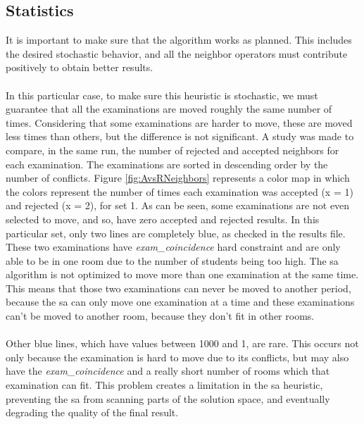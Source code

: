 \subsection{Statistics}
\label{sub:SAStatistics}
It is important to make sure that the algorithm works as planned. This includes the desired stochastic behavior, and all the neighbor operators must contribute positively to obtain better results.\\
\\
In this particular case, to make sure this heuristic is stochastic, we must guarantee that all the examinations are moved roughly the same number of times. Considering that some examinations are harder to move, these are moved less times than others, but the difference is not significant. A study was made to compare, in the same run, the number of rejected and accepted neighbors for each examination. The examinations are sorted in descending order by the number of conflicts. Figure \ref{fig:AvsRNeighbors} represents a color map in which the colors represent the number of times each examination was accepted (x = 1) and rejected (x = 2), for set 1. As can be seen, some examinations are not even selected to move, and so, have zero accepted and rejected results. In this particular set, only two lines are completely blue, as checked in the results file. These two examinations have \textit{exam\_coincidence} hard constraint and are only able to be in one room due to the number of students being too high. The \gls{sa} algorithm is not optimized to move more than one examination at the same time. This means that those two examinations can never be moved to another period, because the \gls{sa} can only move one examination at a time and these examinations can't be moved to another room, because they don't fit in other rooms.\\
\\
Other blue lines, which have values between 1000 and 1, are rare. This occurs not only because the examination is hard to move due to its conflicts, but may also have the \textit{exam\_coincidence} and a really short number of rooms which that examination can fit. This problem creates a limitation in the \gls{sa} heuristic, preventing the \gls{sa} from scanning parts of the solution space, and eventually degrading the quality of the final result.\\
\\
